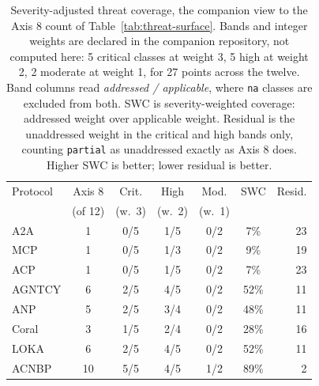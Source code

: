 
\begin{table}[t]
  \centering
  \caption{Severity-adjusted threat coverage, the companion view to the Axis 8 count of Table~\ref{tab:threat-surface}. Bands and integer weights are declared in the companion repository, not computed here: 5 critical classes at weight 3, 5 high at weight 2, 2 moderate at weight 1, for 27 points across the twelve. Band columns read \emph{addressed / applicable}, where \texttt{na} classes are excluded from both. SWC is severity-weighted coverage: addressed weight over applicable weight. Residual is the unaddressed weight in the critical and high bands only, counting \texttt{partial} as unaddressed exactly as Axis 8 does. Higher SWC is better; lower residual is better.}
  \label{tab:severity-coverage}
  \footnotesize
  \begin{tabular}{lcccccr}
    \toprule
    Protocol & Axis 8 & Crit. & High & Mod. & SWC & Resid. \\
             & (of 12) & (w.\ 3) & (w.\ 2) & (w.\ 1) & & \\
    \midrule
    A2A & 1 & 0/5 & 1/5 & 0/2 & 7\% & 23 \\
    MCP & 1 & 0/5 & 1/3 & 0/2 & 9\% & 19 \\
    ACP & 1 & 0/5 & 1/5 & 0/2 & 7\% & 23 \\
    AGNTCY & 6 & 2/5 & 4/5 & 0/2 & 52\% & 11 \\
    ANP & 5 & 2/5 & 3/4 & 0/2 & 48\% & 11 \\
    Coral & 3 & 1/5 & 2/4 & 0/2 & 28\% & 16 \\
    LOKA & 6 & 2/5 & 4/5 & 0/2 & 52\% & 11 \\
    ACNBP & 10 & 5/5 & 4/5 & 1/2 & 89\% & 2 \\
    \bottomrule
  \end{tabular}
\end{table}
